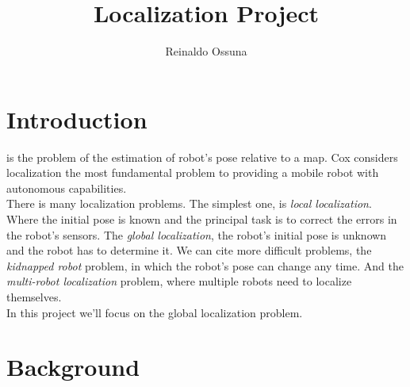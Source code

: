\documentclass[10pt,journal,compsoc]{IEEEtran}
\begin{document}
\title{Localization Project}



\author{Reinaldo Ossuna}

%
{}



\maketitle
\IEEEdisplaynontitleabstractindextext
\IEEEpeerreviewmaketitle
\section{Introduction}
\label{sec:introduction}

 is the problem of the estimation of robot's pose relative to a map. Cox\cite{cox1991}
considers
localization the most fundamental problem to providing a mobile robot with autonomous capabilities.\\
There is many localization problems. The simplest one, is \textit{local localization}. Where the initial pose is known and the
principal task is to correct the errors in the robot's sensors. The \textit{global localization}, the robot's initial pose is
unknown and the robot has to determine it. We can cite more difficult problems, the \textit{kidnapped
robot} problem, in which the robot's pose can change any time. And the \textit{multi-robot localization} problem, where multiple robots
need to localize themselves.
\\In this project we'll focus on the global localization problem.


\section{Background}
\end{document}
